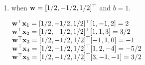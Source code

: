 \documentclass[12pt, fullpage,letterpaper]{article}
\begin{document}
\begin{enumerate}
\begin{enumerate}









\item when ${\bf w} = [1/2,-1/2,1/2]^\top$ and $b = 1$.

${\bf w}^\top {\bf x}_1 = [1/2, -1/2, 1/2]^\top[1, -1, 2]  = 2   $     \\
${\bf w}^\top {\bf x}_2 = [1/2, -1/2, 1/2]^\top[1, 1, 3]   = 3/2 $    \\
${\bf w}^\top {\bf x}_3 = [1/2, -1/2, 1/2]^\top[-1, 1, 0]  = -1  $    \\
${\bf w}^\top {\bf x}_4 = [1/2, -1/2, 1/2]^\top[1, 2, -4]  = -5/2$  \\
${\bf w}^\top {\bf x}_5 = [1/2, -1/2, 1/2]^\top[3, -1, -1] = 3/2 $  \\


\end{enumerate}
\end{enumerate}
\end{document}
